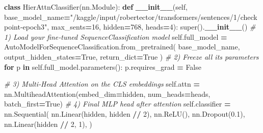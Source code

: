 \documentclass[
]{article}
\newenvironment{Shaded}{\begin{snugshade}}{\end{snugshade}}
\newcommand{\BuiltInTok}[1]{#1}
\newcommand{\CommentTok}[1]{\textcolor[rgb]{0.56,0.35,0.01}{\textit{#1}}}
\newcommand{\ControlFlowTok}[1]{\textcolor[rgb]{0.13,0.29,0.53}{\textbf{#1}}}
\newcommand{\DecValTok}[1]{\textcolor[rgb]{0.00,0.00,0.81}{#1}}
\newcommand{\FloatTok}[1]{\textcolor[rgb]{0.00,0.00,0.81}{#1}}
\newcommand{\FunctionTok}[1]{\textcolor[rgb]{0.13,0.29,0.53}{\textbf{#1}}}
\newcommand{\KeywordTok}[1]{\textcolor[rgb]{0.13,0.29,0.53}{\textbf{#1}}}
\newcommand{\NormalTok}[1]{#1}
\newcommand{\OperatorTok}[1]{\textcolor[rgb]{0.81,0.36,0.00}{\textbf{#1}}}
\newcommand{\StringTok}[1]{\textcolor[rgb]{0.31,0.60,0.02}{#1}}
\newcommand{\VariableTok}[1]{\textcolor[rgb]{0.00,0.00,0.00}{#1}}
\begin{document}
\begin{Shaded}
\begin{Highlighting}[]
\KeywordTok{class}\NormalTok{ HierAttnClassifier(nn.Module):}
    \KeywordTok{def} \FunctionTok{\_\_init\_\_}\NormalTok{(}\VariableTok{self}\NormalTok{,}
\NormalTok{                 base\_model\_name}\OperatorTok{=}\StringTok{"/kaggle/input/robertector/transformers/sentences/1/checkpoint{-}epoch3"}\NormalTok{,}
\NormalTok{                 max\_sents}\OperatorTok{=}\DecValTok{16}\NormalTok{,}
\NormalTok{                 hidden}\OperatorTok{=}\DecValTok{768}\NormalTok{,}
\NormalTok{                 heads}\OperatorTok{=}\DecValTok{4}\NormalTok{):}
        \BuiltInTok{super}\NormalTok{().}\FunctionTok{\_\_init\_\_}\NormalTok{()}
        \CommentTok{\# 1) Load your fine‑tuned SequenceClassification model}
        \VariableTok{self}\NormalTok{.full\_model }\OperatorTok{=}\NormalTok{ AutoModelForSequenceClassification.from\_pretrained(}
\NormalTok{            base\_model\_name, output\_hidden\_states}\OperatorTok{=}\VariableTok{True}\NormalTok{, return\_dict}\OperatorTok{=}\VariableTok{True}
\NormalTok{        )}
        \CommentTok{\# 2) Freeze all its parameters}
        \ControlFlowTok{for}\NormalTok{ p }\KeywordTok{in} \VariableTok{self}\NormalTok{.full\_model.parameters():}
\NormalTok{            p.requires\_grad }\OperatorTok{=} \VariableTok{False}

        \CommentTok{\# 3) Multi‑Head Attention on the CLS embeddings}
        \VariableTok{self}\NormalTok{.attn }\OperatorTok{=}\NormalTok{ nn.MultiheadAttention(embed\_dim}\OperatorTok{=}\NormalTok{hidden,}
\NormalTok{                                          num\_heads}\OperatorTok{=}\NormalTok{heads,}
\NormalTok{                                          batch\_first}\OperatorTok{=}\VariableTok{True}\NormalTok{)}
        \CommentTok{\# 4) Final MLP head after attention}
        \VariableTok{self}\NormalTok{.classifier }\OperatorTok{=}\NormalTok{ nn.Sequential(}
\NormalTok{            nn.Linear(hidden, hidden }\OperatorTok{//} \DecValTok{2}\NormalTok{),}
\NormalTok{            nn.ReLU(),}
\NormalTok{            nn.Dropout(}\FloatTok{0.1}\NormalTok{),}
\NormalTok{            nn.Linear(hidden }\OperatorTok{//} \DecValTok{2}\NormalTok{, }\DecValTok{1}\NormalTok{),}
\NormalTok{        )}


\end{Highlighting}
\end{Shaded}
\end{document}
